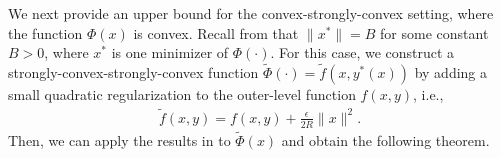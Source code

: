 \documentclass{osudissert96}
\DeclareMathOperator*{\argmin}{arg\,min}
\begin{document}
We next provide an upper bound for the convex-strongly-convex setting, where the  function $\Phi(x)$ is convex. Recall from  that $\|x^*\|=B$ for some constant $B>0$, where $x^*$ is one minimizer of $\Phi(\cdot)$.
For this case, we construct a strongly-convex-strongly-convex function $\widetilde \Phi(\cdot)=\widetilde f(x,y^*(x))$ by adding a small quadratic regularization to the outer-level function $f(x,y)$, i.e., 
\begin{align}\label{regularized_fxy}
\widetilde f(x,y) = f(x,y) +\frac{\epsilon}{2R} \|x\|^2. 
\end{align}
Then, we can apply the results in  to $\widetilde\Phi(x)$ and obtain the following theorem. %
\end{document}
